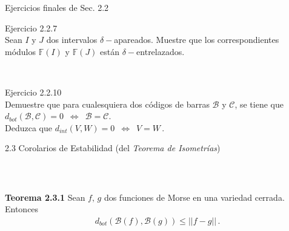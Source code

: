 \documentclass{beamer}
\newcounter{Ejercicio}
\def\matched{apareados}
\begin{document}
\begin{frame}{Ejercicios finales de Sec. 2.2}
\centering
\begin{minipage}{0.7\textwidth}
Ejercicio 2.2.7\\
Sean $I$ y $J$ dos intervalos $\delta-$\matched. Muestre que los correspondientes m\'odulos $\mathbb{F}(I)$ y $\mathbb{F}(J)$ est\'an $\delta-$entrelazados.
\end{minipage}\\

\vspace{21em}

\begin{minipage}{0.7\textwidth}
Ejercicio 2.2.10\\
Demuestre que para cualesquiera dos c\'odigos de barras $\mathcal{B}$ y $\mathcal{C}$, se tiene que $d_{bot}\left(\mathcal{B},\mathcal{C}\right)=0\,\,\, \Leftrightarrow \,\,\, \mathcal{B}=\mathcal{C}$.\\
\vspace{1em}
Deduzca que $d_{int}\left( V,W\right)=0\,\,\,\Leftrightarrow\,\,\, V=W\,.$
\end{minipage}
\end{frame}


\begin{frame}{2.3 Corolarios de Estabilidad (del \emph{Teorema de Isometr\'ias})}
    \begin{minipage}{0.45\textwidth}
   $\,$\hfill \scalebox{0.7}{Teorema de Isometr\'ias:$\,\,\,\,\,\,$}
    \end{minipage} \begin{minipage}{0.45\textwidth}
    \end{minipage}\\
    \vspace{1em}
    \centering
    \begin{minipage}{0.45\textwidth}
    \end{minipage}

    \vspace{3em}
    \begin{block}{\textbf{Teorema 2.3.1}}
    Sean $f,\,g$ dos funciones de Morse en una variedad cerrada. Entonces
    \begin{gather*}
    d_{bot}\left(\mathcal{B}(f),\mathcal{B}(g) \right)\leq ||f-g||\,.
    \end{gather*}
    \end{block}
\end{frame}
\end{document}
